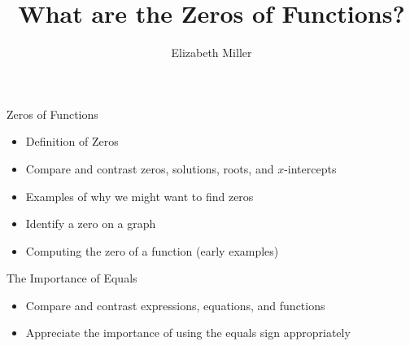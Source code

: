 \documentclass{ximera}
\author{Elizabeth Miller}
\title{What are the Zeros of Functions?}
\begin{document}
\begin{abstract}
\end{abstract}
\maketitle


\begin{objectives}

\item Zeros of Functions
\begin{itemize}
	\item Definition of Zeros 
	\item Compare and contrast zeros, solutions, roots, and $x$-intercepts 
	\item Examples of why we might want to find zeros
	\item Identify a zero on a graph
	\item Computing the zero of a function (early examples)
\end{itemize}

\item The Importance of Equals
\begin{itemize}
	\item Compare and contrast expressions, equations, and functions
	\item Appreciate the importance of using the equals sign appropriately
\end{itemize}



\end{objectives}
\end{document}
